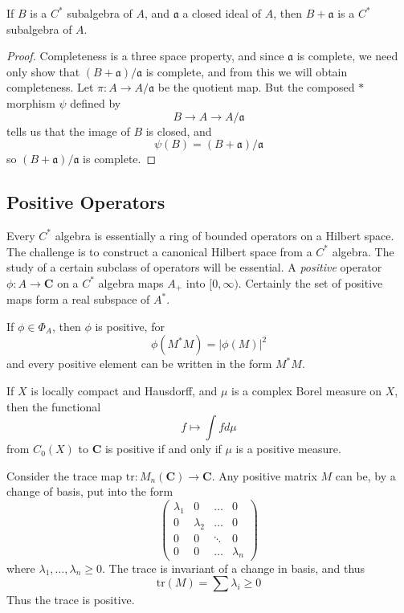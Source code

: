 \begin{prop}
    If $B$ is a $C^*$ subalgebra of $A$, and $\mathfrak{a}$ a closed ideal of $A$, then $B + \mathfrak{a}$ is a $C^*$ subalgebra of $A$.
\end{prop}
\begin{proof}
    Completeness is a three space property, and since $\mathfrak{a}$ is complete, we need only show that $(B + \mathfrak{a})/\mathfrak{a}$ is complete, and from this we will obtain completeness. Let $\pi: A \to A/\mathfrak{a}$ be the quotient map. But the composed $*$ morphism $\psi$ defined by
    \[ B \to A \to A/\mathfrak{a} \]
    tells us that the image of $B$ is closed, and
    \[ \psi(B) = (B + \mathfrak{a})/\mathfrak{a} \]
    so $(B + \mathfrak{a})/\mathfrak{a}$ is complete.
\end{proof}




\subsection{Positive Operators}

Every $C^*$ algebra is essentially a ring of bounded operators on a Hilbert space. The challenge is to construct a canonical Hilbert space from a $C^*$ algebra. The study of a certain subclass of operators will be essential. A \emph{positive} operator $\phi: A \to \mathbf{C}$ on a $C^*$ algebra maps $A_+$ into $[0,\infty)$. Certainly the set of positive maps form a real subspace of $A^*$.

\begin{example}
    If $\phi \in \Phi_A$, then $\phi$ is positive, for
    \[ \phi(M^*M) = |\phi(M)|^2 \]
    and every positive element can be written in the form $M^*M$.
\end{example}

\begin{example}
    If $X$ is locally compact and Hausdorff, and $\mu$ is a complex Borel measure on $X$, then the functional
    \[ f \mapsto \int f d\mu \]
    from $C_0(X)$ to $\mathbf{C}$ is positive if and only if $\mu$ is a positive measure.
\end{example}

\begin{example}
    Consider the trace map $\text{tr}: M_n(\mathbf{C}) \to \mathbf{C}$. Any positive matrix $M$ can be, by a change of basis, put into the form
    \[ \begin{pmatrix} \lambda_1 & 0 & \dots & 0 \\ 0 & \lambda_2 & \dots & 0 \\ 0 & 0 & \ddots & 0 \\ 0 & 0 & \dots & \lambda_n \end{pmatrix} \]
    where $\lambda_1, \dots, \lambda_n \geq 0$. The trace is invariant of a change in basis, and thus
    \[ \text{tr}(M) = \sum \lambda_i \geq 0 \]
    Thus the trace is positive.
\end{example}


